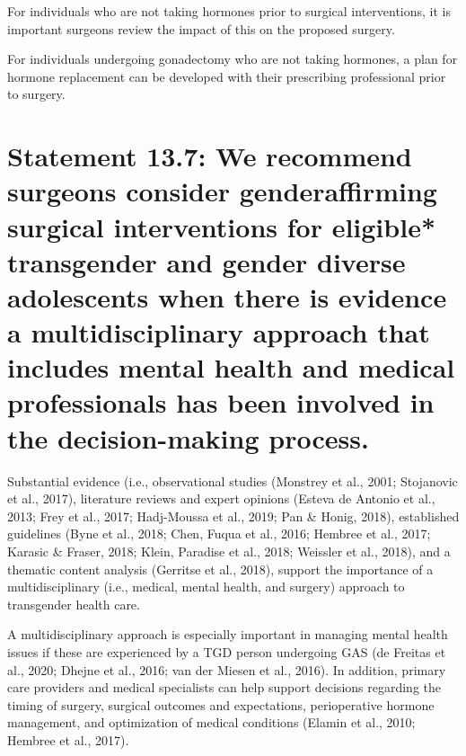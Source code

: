 \documentclass[
]{book}
\begin{document}
For individuals who are not taking hormones
prior to surgical interventions, it is important
surgeons review the impact of this on the proposed surgery.

For individuals undergoing gonadectomy who
are not taking hormones, a plan for hormone
replacement can be developed with their prescribing professional prior to surgery.

\hypertarget{statement-13.7-we-recommend-surgeons-consider-genderaffirming-surgical-interventions-for-eligible-transgender-and-gender-diverse-adolescents-when-there-is-evidence-a-multidisciplinary-approach-that-includes-mental-health-and-medical-professionals-has-been-involved-in-the-decision-making-process.}{%
\section*{Statement 13.7: We recommend surgeons consider genderaffirming surgical interventions for eligible* transgender and gender diverse adolescents when there is evidence a multidisciplinary approach that includes mental health and medical professionals has been involved in the decision-making process.}\label{statement-13.7-we-recommend-surgeons-consider-genderaffirming-surgical-interventions-for-eligible-transgender-and-gender-diverse-adolescents-when-there-is-evidence-a-multidisciplinary-approach-that-includes-mental-health-and-medical-professionals-has-been-involved-in-the-decision-making-process.}}

Substantial evidence (i.e., observational studies
(Monstrey et al., 2001; Stojanovic et al., 2017),
literature reviews and expert opinions (Esteva
de Antonio et al., 2013; Frey et al., 2017;
Hadj-Moussa et al., 2019; Pan \& Honig, 2018),
established guidelines (Byne et al., 2018; Chen,
Fuqua et al., 2016; Hembree et al., 2017; Karasic
\& Fraser, 2018; Klein, Paradise et al., 2018;
Weissler et al., 2018), and a thematic content
analysis (Gerritse et al., 2018), support the
importance of a multidisciplinary (i.e., medical,
mental health, and surgery) approach to transgender health care.

A multidisciplinary approach is especially
important in managing mental health issues if
these are experienced by a TGD person undergoing GAS (de Freitas et al., 2020; Dhejne et al.,
2016; van der Miesen et al., 2016). In addition,
primary care providers and medical specialists
can help support decisions regarding the timing
of surgery, surgical outcomes and expectations,
perioperative hormone management, and optimization of medical conditions (Elamin et al., 2010;
Hembree et al., 2017).
\end{document}

